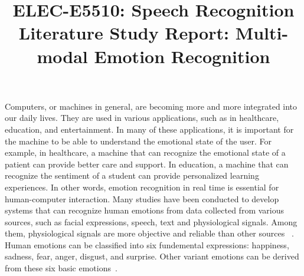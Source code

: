 \documentclass{article}
\title{ELEC-E5510: Speech Recognition\\
    \large Literature Study Report: Multi-modal Emotion Recognition}
\begin{document}
\maketitle


% 
% 

Computers, or machines in general, are becoming more and more integrated into our daily lives.
They are used in various applications, such as in healthcare, education, and entertainment.
In many of these applications, it is important for the machine to be able to understand the
emotional state of the user. For example, in healthcare, a machine that can recognize the
emotional state of a patient can provide better care and support. In education, a machine
that can recognize the sentiment of a student can provide personalized learning experiences.
In other words, emotion recognition in real time is essential for human-computer interaction.
Many studies have been conducted to develop systems that can recognize human emotions from
data collected from various sources, such as facial expressions, speech, text and physiological
signals. Among them, physiological signals are more objective and reliable than other sources
~\cite{unimodal-to-multimodal}.
Human emotions can be classified into six fundemental expressions: happiness, sadness,
fear, anger, disgust, and surprise. Other variant emotions can be derived from these six
basic emotions~\cite{basic-emotions}.
\end{document}

